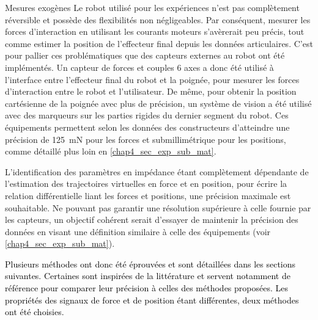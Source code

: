 

\begin{aside}{Mesures exogènes}
	Le robot %
	utilisé pour les expériences n'est pas complètement réversible et possède des flexibilités non négligeables. Par conséquent, mesurer les forces d'interaction en utilisant les courants moteurs s'avèrerait peu précis, tout comme estimer la position de l'effecteur final depuis les données articulaires. C'est pour pallier ces problématiques que des capteurs externes au robot ont été implémentés. Un capteur de forces et couples 6 axes a donc été utilisé à l'interface entre l'effecteur final du robot et la poignée, pour mesurer les forces d'interaction entre le robot et l'utilisateur. De même, pour obtenir la position cartésienne de la poignée avec plus de précision, un système de vision a été utilisé avec des marqueurs sur les parties rigides du dernier segment du robot. Ces équipements permettent selon les données des constructeurs d'atteindre une précision de \SI{125}{\milli\newton} pour les forces et submillimétrique pour les positions, comme détaillé plus loin en \cref{chap4_sec_exp_sub_mat}.
\end{aside}

L'identification des paramètres en impédance étant complètement dépendante de l'estimation des trajectoires virtuelles en force et en position, pour écrire la relation différentielle liant les forces et positions, une précision maximale est souhaitable. Ne pouvant pas garantir une résolution supérieure à celle fournie par les capteurs, un objectif cohérent serait d'essayer de maintenir la précision des données en visant une définition similaire à celle des équipements (voir \cref{chap4_sec_exp_sub_mat}). 


\textcolor{black}{Plusieurs méthodes ont donc été éprouvées et sont détaillées dans les sections suivantes. Certaines sont inspirées de la littérature et servent notamment de référence pour comparer leur précision à celles des méthodes proposées. Les propriétés des signaux de force et de position étant différentes, deux méthodes ont été choisies.}


